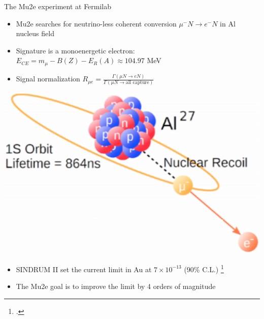 \documentclass[10pt]{beamer}
\begin{document}
\begin{frame}{The Mu2e experiment at Fermilab}
\begin{minipage}{.6\textwidth}
	\begin{itemize}
	\setlength\itemsep{0.4cm}
	\item Mu2e searches for neutrino-less coherent conversion
	$\mu^- N \rightarrow e^- N$ in Al nucleus field
	\item Signature is a monoenergetic electron:\\
 $E_{CE} = m_\mu -B(Z) -E_R(A) \approx 104.97$ MeV
	\item Signal normalization $R_{\mu e }=\frac{\Gamma(\mu N\rightarrow e N)}{\Gamma(\mu N\rightarrow \textrm{all capture})}$
	\end{itemize}
\end{minipage}
\begin{minipage}{0.35\textwidth}
    \centering
    \includegraphics[width=1\textwidth]{conversion_sketch}
\end{minipage}
\vspace{0.4cm}
\begin{itemize}
\setlength\itemsep{0.4cm}
\item SINDRUM II set the current limit in Au at $7\times10^{-13}$ (90\% C.L.) \footcite{SINDRUMII}
\item The Mu2e goal is to improve the limit by 4 orders of magnitude
\end{itemize}
\end{frame}
\end{document}
